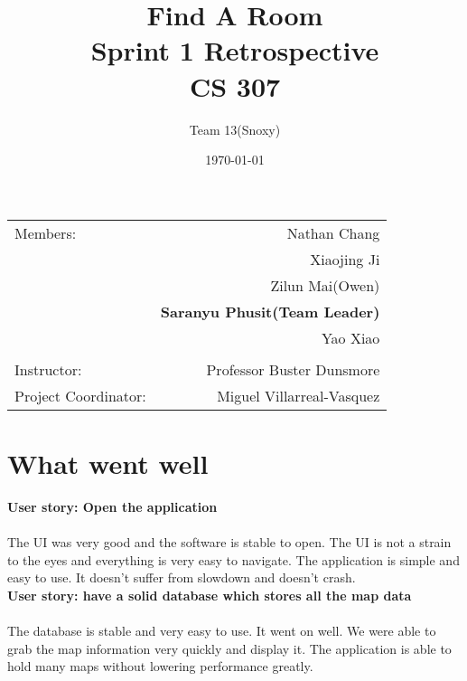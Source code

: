 \documentclass[12pt]{article}
\title{\textbf{Find A Room} \\ Sprint 1 Retrospective \\ CS 307} %
\author{Team \textsc{13}(Snoxy)} %
\date{\today} %
\begin{document}
\maketitle %

\begin{center}
\begin{tabular}{l r}
Members: & Nathan Chang \\ %
& Xiaojing Ji \\
& Zilun Mai(Owen) \\
& \textbf{Saranyu Phusit(Team Leader)} \\
& Yao Xiao \\
\\
\bigskip
Instructor: & Professor Buster Dunsmore \\%
Project Coordinator: & Miguel Villarreal-Vasquez %

\end{tabular}
\end{center}

\newpage




\newpage
\section{What went well}

\textbf{User story: Open the application} \\ \\
The UI was very good and the software is stable to open. The UI is not a strain to the eyes and everything is very easy to navigate. The application is simple and easy to use. It doesn't suffer from slowdown and doesn't crash.\\


\textbf{User story: have a solid database which stores all the map data} \\ \\
The database is stable and very easy to use. It went on well. We were able to grab the map information very quickly and display it. The application is able to hold many maps without lowering performance greatly.\\ 
\end{document}
